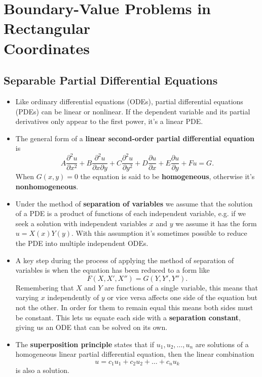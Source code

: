 \documentclass{article}
\begin{document}
\section{Boundary-Value Problems in Rectangular\\Coordinates}

\subsection{Separable Partial Differential Equations}

\begin{itemize}
  \item Like ordinary differential equations (ODEs), partial differential equations (PDEs) can be linear or nonlinear. If the dependent variable and its partial derivatives only appear to the first power, it's a linear PDE.

  \item The general form of a \textbf{linear second-order partial differential equation} is \[A \frac{\partial^2 u}{\partial x^2} + B \frac{\partial^2 u}{\partial x \partial y} + C \frac{\partial^2 u}{\partial y^2} + D \frac{\partial u}{\partial x} + E \frac{\partial u}{\partial y} + F u = G.\] When $G(x, y) = 0$ the equation is said to be \textbf{homogeneous}, otherwise it's \textbf{nonhomogeneous}.

  \item Under the method of \textbf{separation of variables} we assume that the solution of a PDE is a product of functions of each independent variable, e.g. if we seek a solution with independent variables $x$ and $y$ we assume it has the form $u = X(x) Y(y)$. With this assumption it's sometimes possible to reduce the PDE into multiple independent ODEs.

  \item A key step during the process of applying the method of separation of variables is when the equation has been reduced to a form like \[F(X, X', X'') = G(Y, Y', Y'').\] Remembering that $X$ and $Y$ are functions of a single variable, this means that varying $x$ independently of $y$ or vice versa affects one side of the equation but not the other. In order for them to remain equal this means both sides must be constant. This lets us equate each side with a \textbf{separation constant}, giving us an ODE that can be solved on its own.

  \item The \textbf{superposition principle} states that if $u_1, u_2, \ldots, u_n$ are solutions of a homogeneous linear partial differential equation, then the linear combination \[u = c_1 u_1 + c_2 u_2 + \ldots + c_n u_k\] is also a solution.


\end{itemize}
\end{document}
